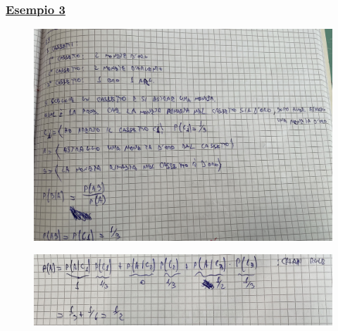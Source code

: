 \documentclass{article}
\begin{document}
\subsubsection{\underline{Esempio 3}}
\begin{figure}[ht]
\centering
\includegraphics[scale=0.10]{ese/11.jpeg}
\end{figure}
\begin{figure}[ht]
\centering
\includegraphics[scale=0.10]{ese/11a.jpeg}
\end{figure}
\newpage
\end{document}
